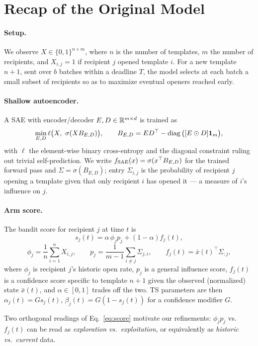 \section{Recap of the Original Model}
\label{sec:recap}

\paragraph{Setup.}
We observe $X \in \{0,1\}^{n \times m}$, where $n$ is the number of
templates, $m$ the number of recipients, and $X_{i,j}=1$ if recipient $j$
opened template $i$. For a new template $n{+}1$, sent over $b$ batches
within a deadline $T$, the model selects at each batch a small subset of
recipients so as to maximize eventual openers reached early.

\paragraph{Shallow autoencoder.}
A SAE with encoder/decoder $E, D \in \mathbb{R}^{m\times d}$ is trained as
\begin{equation*}
\min_{E,D} \ell\big(X,\ \sigma(XB_{E,D})\big),
\qquad
B_{E,D} = ED^\top - \operatorname{diag}\big([E\odot D]\mathbf{1}_m\big),
\end{equation*}
with $\ell$ the element-wise binary cross-entropy and the diagonal
constraint ruling out trivial self-prediction. We write
$f_{\mathrm{SAE}}(x) = \sigma(x^\top B_{E,D})$ for the trained forward pass and
$\Sigma = \sigma(B_{E,D})$; entry $\Sigma_{i,j}$ is the probability of
recipient $j$ opening a template given that only recipient $i$ has opened
it --- a measure of $i$'s influence on $j$.

\paragraph{Arm score.}
The bandit score for recipient $j$ at time $t$ is
\begin{equation}
\label{eq:score}
s_j(t) = \alpha\,\phi_j p_j + (1-\alpha) f_j(t),
\end{equation}
\begin{equation}
\label{eq:phi-p-f}
\phi_j = \frac1n\sum_{i=1}^n X_{i,j},
\qquad
p_j = \frac{1}{m-1}\sum_{i\ne j}\Sigma_{j,i},
\qquad
f_j(t) = \bar x(t)^\top \Sigma_{:j},
\end{equation}
where $\phi_j$ is recipient $j$'s historic open rate, $p_j$ is a general
influence score, $f_j(t)$ is a confidence score specific to template
$n{+}1$ given the observed (normalized) state $\bar x(t)$, and
$\alpha \in [0,1]$ trades off the two. TS parameters are then
$\alpha_j(t) = Gs_j(t)$, $\beta_j(t) = G(1-s_j(t))$ for a confidence
modifier $G$.

Two orthogonal readings of Eq.~\eqref{eq:score} motivate our refinements:
$\phi_j p_j$ vs.\ $f_j(t)$ can be read as \emph{exploration vs.\
exploitation}, or equivalently as \emph{historic vs.\ current} data.
